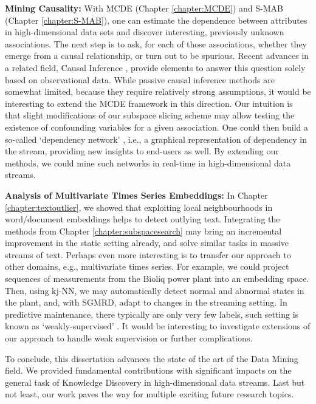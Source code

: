 \textbf{Mining Causality:} With \gls{MCDE} (Chapter \ref{chapter:MCDE}) and \gls{S-MAB} (Chapter \ref{chapter:S-MAB}), one can estimate the dependence between attributes in high-dimensional data sets and discover interesting, previously unknown associations. The next step is to ask, for each of those associations, whether they emerge from a causal relationship, or turn out to be spurious. Recent advances in a related field, Causal Inference \cite{pearl2009, nandy2016causal, lopezpaz2016dependence, DBLP:journals/cacm/Pearl19}, provide elements to answer this question solely based on observational data. While passive causal inference methods are somewhat limited, because they require relatively strong assumptions, it would be interesting to extend the \gls{MCDE} framework in this direction. Our intuition is that slight modifications of our subspace slicing scheme may allow testing the existence of confounding variables for a given association. One could then build a so-called `dependency network' \cite{DBLP:journals/jmlr/HeckermanCMRK00, DBLP:journals/ml/SchulteQKYS16, doi:10.1146/annurev-statistics-060116-053803}, i.e., a graphical representation of dependency in the stream, providing new insights to end-users as well. By extending our methods, we could mine such networks in real-time in high-dimensional data streams. 

\textbf{Analysis of Multivariate Times Series Embeddings:} In Chapter \ref{chapter:textoutlier}, we showed that exploiting local neighbourhoods in word/document embeddings helps to detect outlying text. Integrating the methods from Chapter \ref{chapter:subspacesearch} may bring an incremental improvement in the static setting already, and solve similar tasks in massive streams of text. Perhaps even more interesting is to transfer our approach to other domains, e.g., multivariate times series. For example, we could project sequences of measurements from the \acrshort{Bioliq} power plant into an embedding space. Then, using \gls{kj-NN}, we may automatically detect normal and abnormal states in the plant, and, with \gls{SGMRD}, adapt to changes in the streaming setting. In predictive maintenance, there typically are only very few labels, such setting is known as `weakly-supervised' \cite{10.1093/nsr/nwx106, DBLP:conf/cikm/MengSZ018}.
It would be interesting to investigate extensions of our approach to handle weak supervision or further complications. %

To conclude, this dissertation advances the state of the art of the Data Mining field. We provided fundamental contributions with significant impacts on the general task of Knowledge Discovery in high-dimensional data streams. Last but not least, our work paves the way for multiple exciting future research topics.   
